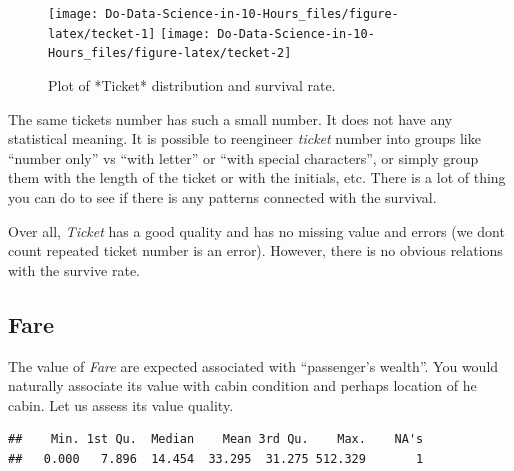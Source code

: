 \documentclass[
]{book}
\newenvironment{Shaded}{\begin{snugshade}}{\end{snugshade}}
\newcommand{\KeywordTok}[1]{\textcolor[rgb]{0.13,0.29,0.53}{\textbf{#1}}}
\newcommand{\NormalTok}[1]{#1}
\newcommand{\OperatorTok}[1]{\textcolor[rgb]{0.81,0.36,0.00}{\textbf{#1}}}
\begin{document}
\begin{figure}

{\centering \texttt{[image: Do-Data-Science-in-10-Hours\_files/figure-latex/tecket-1]} \texttt{[image: Do-Data-Science-in-10-Hours\_files/figure-latex/tecket-2]} 

}

\caption{Plot of *Ticket* distribution and survival rate.}\label{fig:tecket}
\end{figure}

The same tickets number has such a small number. It does not have any statistical meaning. It is possible to reengineer \emph{ticket} number into groups like ``number only'' vs ``with letter'' or ``with special characters'', or simply group them with the length of the ticket or with the initials, etc. There is a lot of thing you can do to see if there is any patterns connected with the survival.

Over all, \emph{Ticket} has a good quality and has no missing value and errors (we dont count repeated ticket number is an error). However, there is no obvious relations with the survive rate.

\hypertarget{fare}{%
\subsection{Fare}\label{fare}}

The value of \emph{Fare} are expected associated with ``passenger's wealth''. You would naturally associate its value with cabin condition and perhaps location of he cabin. Let us assess its value quality.

\begin{Shaded}
\end{Shaded}

\begin{verbatim}
##    Min. 1st Qu.  Median    Mean 3rd Qu.    Max.    NA's 
##   0.000   7.896  14.454  33.295  31.275 512.329       1
\end{verbatim}

\begin{Shaded}
\end{Shaded}
\end{document}
